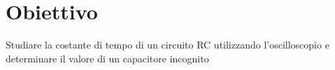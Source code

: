 \section{Obiettivo}

Studiare la costante di tempo di un circuito RC utilizzando l'oscilloscopio e determinare il valore di un capacitore incognito